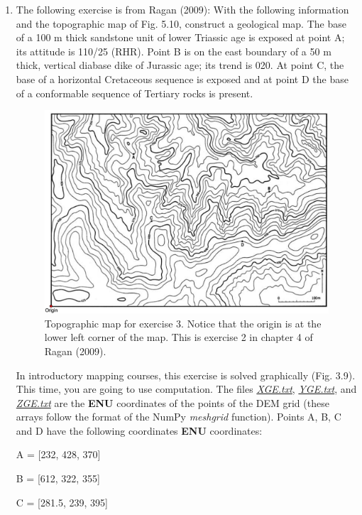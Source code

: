 \documentclass[a4paper , 12pt]{book}
\begin{document}
\begin{enumerate}
    \item The following exercise is from Ragan (2009): With the following information and the topographic map of Fig. 5.10, construct a geological map. The base of a 100 m thick sandstone unit of lower Triassic age is exposed at point A; its attitude is 110/25 (RHR). Point B is on the east boundary of a 50 m thick, vertical diabase dike of Jurassic age; its trend is 020. At point C, the base of a horizontal Cretaceous sequence is exposed and at point D the base of a conformable sequence of Tertiary rocks is present.
    
    \begin{figure}[H]
    \centering
    \includegraphics[width=13cm]{Figures/ch5f15.jpg}
    \caption{Topographic map for exercise 3. Notice that the origin is at the lower left corner of the map. This is exercise 2 in chapter 4 of Ragan (2009).}
    \end{figure}
    
    In introductory mapping courses, this exercise is solved graphically (Fig. 3.9). This time, you are going to use computation. The files \href{http://github.com}{\textit{XGE.txt}}, \href{http://github.com}{\textit{YGE.txt}}, and \href{http://github.com}{\textit{ZGE.txt}} are the \textbf{ENU} coordinates of the points of the DEM grid (these arrays follow the format of the NumPy \textit{meshgrid} function). Points A, B, C and D have the following coordinates \textbf{ENU} coordinates:
    
    A = [232, 428, 370]
    
    B = [612, 322, 355]
    
    C = [281.5, 239, 395]
    

\end{enumerate}
\end{document}
